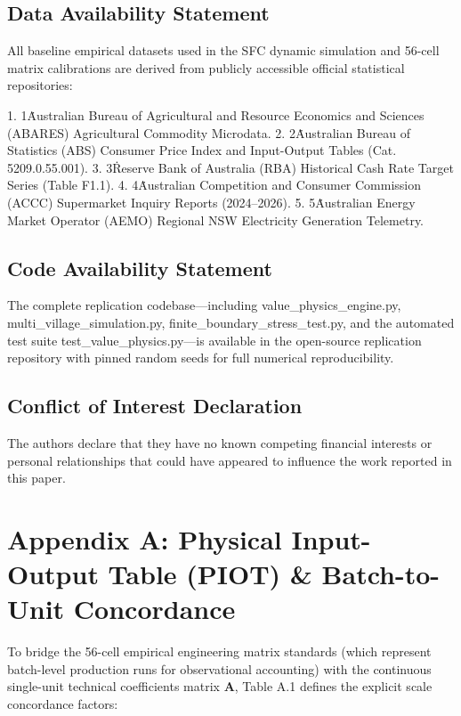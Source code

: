 \documentclass[preprint,12pt,authoryear]{elsarticle}
\theoremstyle{definition}
\begin{document}
\subsection{Data Availability Statement}

All baseline empirical datasets used in the SFC dynamic simulation and 56-cell matrix calibrations are derived from publicly accessible official statistical repositories:

1.  1\. Australian Bureau of Agricultural and Resource Economics and Sciences (ABARES) Agricultural Commodity Microdata.
2.  2\. Australian Bureau of Statistics (ABS) Consumer Price Index and Input-Output Tables (Cat. 5209.0.55.001). 
3.  3\. Reserve Bank of Australia (RBA) Historical Cash Rate Target Series (Table F1.1).
4.  4\. Australian Competition and Consumer Commission (ACCC) Supermarket Inquiry Reports (2024–2026).
5.  5\. Australian Energy Market Operator (AEMO) Regional NSW Electricity Generation Telemetry.

\subsection{Code Availability Statement}

The complete replication codebase—including value\_physics\_engine.py, multi\_village\_simulation.py, finite\_boundary\_stress\_test.py, and the automated test suite test\_value\_physics.py—is available in the open-source replication repository with pinned random seeds for full numerical reproducibility.

\subsection{Conflict of Interest Declaration}

The authors declare that they have no known competing financial interests or personal relationships that could have appeared to influence the work reported in this paper.





\section*{Appendix A: Physical Input-Output Table (PIOT) \& Batch-to-Unit Concordance}

To bridge the 56-cell empirical engineering matrix standards (which represent batch-level production runs for observational accounting) with the continuous single-unit technical coefficients matrix $\mathbf{A}$, Table A.1 defines the explicit scale concordance factors:
\end{document}
